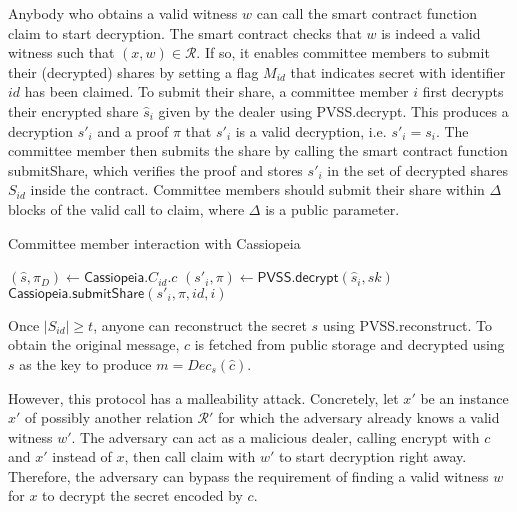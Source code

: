 Anybody who obtains a valid witness $w$ can call the smart contract function \textsf{claim} to start decryption.
The smart contract checks that $w$ is indeed a valid witness such that $(x, w) \in \mathcal{R}$.
If so, it enables committee members to submit their (decrypted) shares by setting a flag $M_{id}$ that indicates secret with identifier $id$ has been claimed.
To submit their share, a committee member $i$ first decrypts their encrypted share $\hat{s}_i$ given by the dealer using \textsf{PVSS.decrypt}.
This produces a decryption $s'_i$ and a proof $\pi$ that $s'_i$ is a valid decryption, i.e. $s'_i = s_i$.
The committee member then submits the share by calling the smart contract function \textsf{submitShare}, which verifies the proof and stores $s'_i$ in the set of decrypted shares $S_{id}$ inside the contract.
Committee members should submit their share within $\Delta$ blocks of the valid call to \textsf{claim}, where $\Delta$ is a public parameter.

\begin{algorithm}[H]
    \caption{Committee member interaction with Cassiopeia}
\label{committee_member_alg_no_incentives}
    \begin{algorithmic}[1]
            \State $(\hat{s}, \pi_D) \gets \textsf{Cassiopeia}.C_{id}.c$
            \State $(s'_i, \pi) \gets \textsf{PVSS.decrypt}(\hat{s}_i, sk)$
            \State $\textsf{Cassiopeia.submitShare}(s'_i, \pi, id, i)$
        \EndOn
    \end{algorithmic}
\end{algorithm}

Once $|S_{id}| \geq t$, anyone can reconstruct the secret $s$ using \textsf{PVSS.reconstruct}.
To obtain the original message, $\hat{c}$ is fetched from public storage and decrypted using $s$ as the key to produce $m = Dec_s(\hat{c})$.

However, this protocol has a malleability attack.
Concretely, let $x'$ be an instance $x'$ of possibly another relation $\mathcal{R}'$ for which the adversary already knows a valid witness $w'$.
The adversary can act as a malicious dealer, calling \textsf{encrypt} with $c$ and $x'$ instead of $x$, then call \textsf{claim} with $w'$ to start decryption right away.
Therefore, the adversary can bypass the requirement of finding a valid witness $w$ for $x$ to decrypt the secret encoded by $c$.

